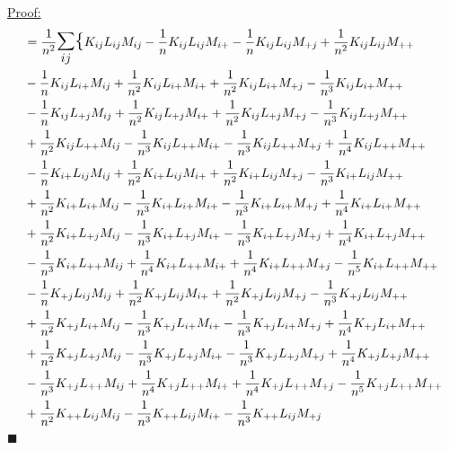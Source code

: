 \documentclass[12pt]{article}
\newenvironment{claimproof}[1]{\par\noindent\underline{Proof:}\space#1}{\hfill $\blacksquare$}
\numberwithin{claim}{section}
\numberwithin{lemma}{section}
\numberwithin{theorem}{section}
\begin{document}
\begin{claimproof}
\begin{align*}
&= \frac{1}{n^2} \mathlarger{\mathlarger{\sum_{ij}}} \mathlarger{\mathlarger{\{}}    K_{ij}  L_{ij}  M_{ij}
- \frac{1}{n}  K_{ij}  L_{ij}  M_{i+}
- \frac{1}{n}  K_{ij}  L_{ij}  M_{+j}
+ \frac{1}{n^2}  K_{ij}  L_{ij}  M_{++}
\\&
- \frac{1}{n}  K_{ij}  L_{i+}  M_{ij}
+ \frac{1}{n^2}  K_{ij}  L_{i+}  M_{i+}
+ \frac{1}{n^2}  K_{ij}  L_{i+}  M_{+j}
- \frac{1}{n^3}  K_{ij}  L_{i+}  M_{++}
\\&
- \frac{1}{n}  K_{ij}  L_{+j}  M_{ij}
+ \frac{1}{n^2}  K_{ij}  L_{+j}  M_{i+}
+ \frac{1}{n^2}  K_{ij}  L_{+j}  M_{+j}
- \frac{1}{n^3}  K_{ij}  L_{+j}  M_{++}
\\&
+ \frac{1}{n^2}  K_{ij}  L_{++}  M_{ij}
- \frac{1}{n^3}  K_{ij}  L_{++}  M_{i+}
- \frac{1}{n^3}  K_{ij}  L_{++}  M_{+j}
+ \frac{1}{n^4}  K_{ij}  L_{++}  M_{++}
\\&
- \frac{1}{n}  K_{i+}  L_{ij}  M_{ij}
+ \frac{1}{n^2}  K_{i+}  L_{ij}  M_{i+}
+ \frac{1}{n^2}  K_{i+}  L_{ij}  M_{+j}
- \frac{1}{n^3}  K_{i+}  L_{ij}  M_{++}
\\&
+ \frac{1}{n^2}  K_{i+}  L_{i+}  M_{ij}
- \frac{1}{n^3}  K_{i+}  L_{i+}  M_{i+}
- \frac{1}{n^3}  K_{i+}  L_{i+}  M_{+j}
+ \frac{1}{n^4}  K_{i+}  L_{i+}  M_{++}
\\&
+ \frac{1}{n^2}  K_{i+}  L_{+j}  M_{ij}
- \frac{1}{n^3}  K_{i+}  L_{+j}  M_{i+}
- \frac{1}{n^3}  K_{i+}  L_{+j}  M_{+j}
+ \frac{1}{n^4}  K_{i+}  L_{+j}  M_{++}
\\&
- \frac{1}{n^3}  K_{i+}  L_{++}  M_{ij}
+ \frac{1}{n^4}  K_{i+}  L_{++}  M_{i+}
+ \frac{1}{n^4}  K_{i+}  L_{++}  M_{+j}
- \frac{1}{n^5}  K_{i+}  L_{++}  M_{++}
\\&
- \frac{1}{n}  K_{+j}  L_{ij}  M_{ij}
+ \frac{1}{n^2}  K_{+j}  L_{ij}  M_{i+}
+ \frac{1}{n^2}  K_{+j}  L_{ij}  M_{+j}
- \frac{1}{n^3}  K_{+j}  L_{ij}  M_{++}
\\&
+ \frac{1}{n^2}  K_{+j}  L_{i+}  M_{ij}
- \frac{1}{n^3}  K_{+j}  L_{i+}  M_{i+}
- \frac{1}{n^3}  K_{+j}  L_{i+}  M_{+j}
+ \frac{1}{n^4}  K_{+j}  L_{i+}  M_{++}
\\&
+ \frac{1}{n^2}  K_{+j}  L_{+j}  M_{ij}
- \frac{1}{n^3}  K_{+j}  L_{+j}  M_{i+}
- \frac{1}{n^3}  K_{+j}  L_{+j}  M_{+j}
+ \frac{1}{n^4}  K_{+j}  L_{+j}  M_{++}
\\&
- \frac{1}{n^3}  K_{+j}  L_{++}  M_{ij}
+ \frac{1}{n^4}  K_{+j}  L_{++}  M_{i+}
+ \frac{1}{n^4}  K_{+j}  L_{++}  M_{+j}
- \frac{1}{n^5}  K_{+j}  L_{++}  M_{++}
\\&
+ \frac{1}{n^2}  K_{++}  L_{ij}  M_{ij}
- \frac{1}{n^3}  K_{++}  L_{ij}  M_{i+}
- \frac{1}{n^3}  K_{++}  L_{ij}  M_{+j}

\end{align*}
\end{claimproof}
\end{document}
